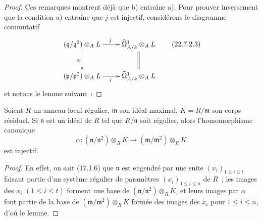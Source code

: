 \begin{proof}
Ces remarques montrent déjà que b) entraîne a). Pour prouver inversement que
la condition a) entraîne que $j$ est injectif, considérons le diagramme
commutatif
\begin{equation}
\label{0.22.7.2.3-fr}
\xymatrix{
  (\mathfrak q/\mathfrak q^2)\otimes_AL
    \ar[r]^j \ar[d]_\alpha &
  \widehat\Omega^1_{A/k}\otimes_AL \ar@{=}[d] \\
  (\mathfrak p/\mathfrak p^2)\otimes_AL
    \ar[r]_i &
  \widehat\Omega^1_{A/k}\otimes_AL
}
\tag{22.7.2.3}
\end{equation}
et notons le lemme suivant~:
\end{proof}

\begin{lemma}[22.7.2.4]
\label{0.22.7.2.4-fr}
Soient $R$ un anneau local régulier, $\mathfrak m$ son idéal maximal,
$K=R/\mathfrak m$ son corps résiduel. Si $\mathfrak n$ est un idéal de $R$ tel
que $R/\mathfrak n$ soit régulier, alors l'homomorphisme canonique
\begin{equation}
\label{0.22.7.2.5-fr}
  \alpha:(\mathfrak n/\mathfrak n^2)\otimes_RK
  \longrightarrow(\mathfrak m/\mathfrak m^2)\otimes_RK
  \tag{22.7.2.5}
\end{equation}
est injectif.
\end{lemma}

\begin{proof}
En effet, on sait (17.1.6) que $\mathfrak n$ est engendré par une suite
$(x_i)_{1\leq i\leq t}$ faisant partie d'un système régulier de paramètres
$(x_i)_{1\leq i\leq n}$ de $R$~; les images des $x_i$ $(1\leq i\leq t)$
forment une base de $(\mathfrak n/\mathfrak n^2)\otimes_RK$, et leurs images
par $\alpha$ font partie de la base de
$(\mathfrak m/\mathfrak m^2)\otimes_RK$ formée des images des $x_i$ pour
$1\leq i\leq n$, d'où le lemme.
\end{proof}

